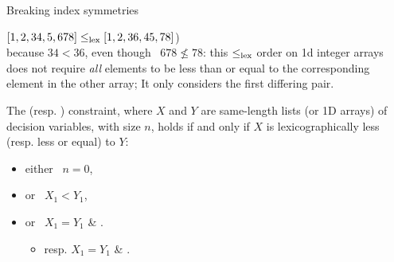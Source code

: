 \documentclass{cons-beamer}
\begin{document}
\begin{frame}{Breaking index symmetries}
  \begin{example}
    $[1,2,34,5,678] \leq_{\textnormal{lex}} [1,2,36,45,78]$) \\
    because $34 < 36$, even though~
    $678 \not\leq 78$: this $\leq_{\textnormal{lex}}$ order on
    1d integer arrays does not require \textit{all} elements to be less than or equal to the corresponding element in the other array; It only considers the first differing pair.
  \end{example}\vfill
  
  \begin{definition}
    The  (resp. ) constraint, where $X$
    and $Y$ are same-length lists (or 1D arrays) of decision variables, with size $n$,
    holds if and only if $X$ is lexicographically less (resp. less or equal) to $Y$:
    \begin{itemize}
      \item either~ $n = 0$,
      \item or~ $X_1 < Y_1$,
      \item or~ $X_1 = Y_1$ \& .
      \begin{itemize}
        \item resp. $X_1 = Y_1$ \& .
      \end{itemize}
    \end{itemize}
  \end{definition}
\end{frame}
\end{document}
